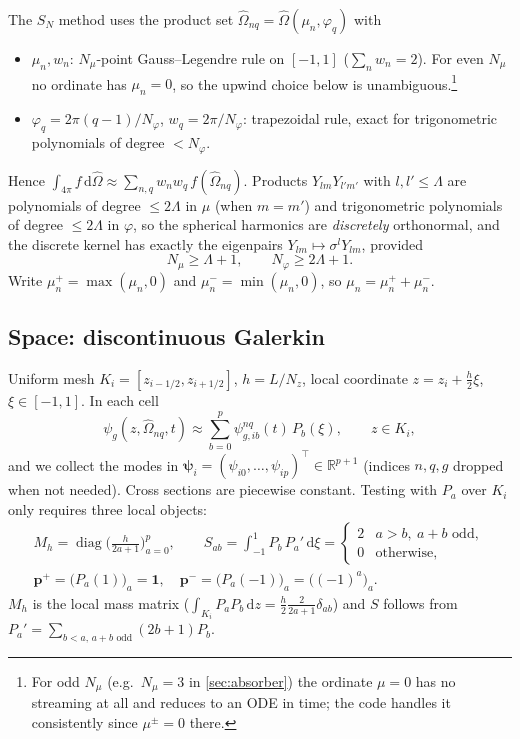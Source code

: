 \documentclass[11pt,a4paper]{article}
\numberwithin{equation}{section}
\theoremstyle{remark}
\newcommand{\Om}{\hat{\Omega}}
\newcommand{\dd}{\mathrm{d}}
\newcommand{\Lmax}{\Lambda}
\newcommand{\R}{\mathbb{R}}
\newcommand{\pp}{{\bm{p}^{+}}}
\newcommand{\pmn}{{\bm{p}^{-}}}
\newcommand{\diag}{\operatorname{diag}}
\begin{document}
The $S_N$ method uses the product set $\Om_{nq}=\Om(\mu_n,\varphi_q)$ with
\begin{itemize}[nosep]
\item $\mu_n,w_n$: $N_\mu$-point Gauss--Legendre rule on $[-1,1]$ ($\sum_nw_n=2$). For even $N_\mu$ no ordinate has $\mu_n=0$, so the upwind choice below is unambiguous.\footnote{For odd $N_\mu$ (e.g.\ $N_\mu=3$ in \cref{sec:absorber}) the ordinate $\mu=0$ has no streaming at all and reduces to an ODE in time; the code handles it consistently since $\mu^\pm=0$ there.}
\item $\varphi_q=2\pi(q-1)/N_\varphi$, $w_q=2\pi/N_\varphi$: trapezoidal rule, exact for trigonometric polynomials of degree $<N_\varphi$.
\end{itemize}
Hence $\int_{4\pi}f\,\dd\Om\approx\sum_{n,q}w_nw_q\,f(\Om_{nq})$. Products $Y_{lm}Y_{l'm'}$ with $l,l'\le\Lmax$ are polynomials of degree $\le2\Lmax$ in $\mu$ (when $m=m'$) and trigonometric polynomials of degree $\le2\Lmax$ in $\varphi$, so the spherical harmonics are \emph{discretely} orthonormal, and the discrete kernel has exactly the eigenpairs $Y_{lm}\mapsto\sigma^l Y_{lm}$, provided
\begin{equation}
N_\mu\ge\Lmax+1,\qquad N_\varphi\ge2\Lmax+1.
\label{eq:quad-exact}
\end{equation}
Write $\mu^+_n=\max(\mu_n,0)$ and $\mu^-_n=\min(\mu_n,0)$, so $\mu_n=\mu_n^++\mu_n^-$.

\subsection{Space: discontinuous Galerkin}
\label{sec:dg}

Uniform mesh $K_i=[z_{i-1/2},z_{i+1/2}]$, $h=L/N_z$, local coordinate $z=z_i+\tfrac h2\xi$, $\xi\in[-1,1]$. In each cell
\begin{equation}
\psi_g(z,\Om_{nq},t)\approx\sum_{b=0}^{p}\psi^{nq}_{g,ib}(t)\,P_b(\xi),\qquad z\in K_i,
\end{equation}
and we collect the modes in $\bm\psi_i=(\psi_{i0},\dots,\psi_{ip})^\top\in\R^{p+1}$ (indices $n,q,g$ dropped when not needed).
Cross sections are piecewise constant. Testing with $P_a$ over $K_i$ only requires three local objects:
\begin{gather}
M_h=\diag\Big(\frac{h}{2a+1}\Big)_{a=0}^{p},\qquad
S_{ab}=\int_{-1}^{1}P_b\,P_a'\,\dd\xi=\begin{cases}2 & a>b,\ a+b\text{ odd},\\0&\text{otherwise,}\end{cases}\\
\pp=\big(P_a(1)\big)_a=\bm 1,\quad \pmn=\big(P_a(-1)\big)_a=\big((-1)^a\big)_a .
\end{gather}
$M_h$ is the local mass matrix ($\int_{K_i}P_aP_b\,\dd z=\frac h2\frac{2}{2a+1}\delta_{ab}$) and $S$ follows from $P_a'=\sum_{b<a,\,a+b\text{ odd}}(2b+1)P_b$.
\end{document}
